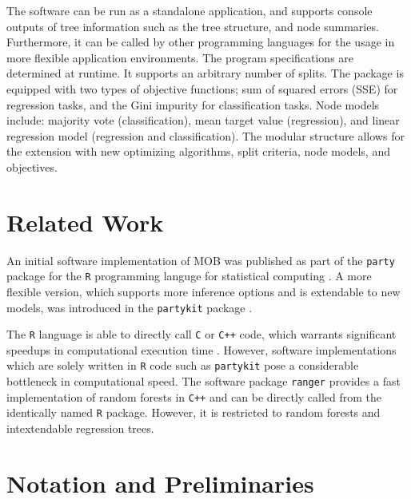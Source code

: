 \documentclass[a4paper, 11pt]{article}
\begin{document}
The software can be run as a standalone application, and supports console outputs of tree information such as the tree structure, and node summaries. Furthermore, it can be called by other programming languages for the usage in more flexible application environments. The program specifications are determined at runtime. It supports an arbitrary number of splits.
The package is equipped with two types of objective functions; sum of squared errors (SSE) for regression tasks, and the Gini impurity for classification tasks. Node models include: majority vote (classification), mean target value (regression), and linear regression model (regression and classification).
The modular structure allows for the extension with 
new optimizing algorithms, split criteria, node models, and objectives. 

\section{Related Work}

An initial software implementation of MOB was published as part of the \texttt{party} package \cite{party_package} for the \texttt{R} programming languge for statistical computing \cite{r_citation}. A more flexible version, which supports more inference options and is extendable to new models, was introduced in the \texttt{partykit} package \cite{partykit_package}. 
\par
The \texttt{R} language is able to directly call \texttt{C} or \texttt{C++} code, which warrants significant speedups in computational execution time \cite{eddelbuettel_rcpp}. However, software implementations which are solely written in \texttt{R} code such as \texttt{partykit} pose a considerable bottleneck in computational speed.
The software package \texttt{ranger} \cite{ranger_package} provides a fast implementation of random forests in \texttt{C++} and can be directly called from the identically named \texttt{R} package. However, it is restricted to random forests and intextendable regression trees.

\section{Notation and Preliminaries}
\end{document}
